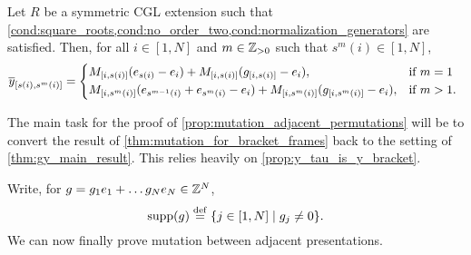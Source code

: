 \begin{theorem}\label{thm:mutation_for_bracket_frames}
	Let $R$ be a symmetric CGL extension such that \cref{cond:square_roots,cond:no_order_two,cond:normalization_generators} are satisfied. Then, for all $i \in [1, N]$ and $m \in \mathbb{Z}_{> 0}$ such that $s^m(i) \in [1, N]$,
	\begin{equation*}
		\oy_{[s(i), s^m(i)]} = \begin{dcases*}
			M_{[i, s(i)]}(e_{s(i)} - e_i) + M_{[i, s(i)]}(g_{[i, s(i)]} - e_i),                         & if $m=1$    \\
			M_{[i, s^m(i)]}(e_{s^{m-1}(i)} + e_{s^m(i)} -e_i) + M_{[i, s^m(i)]}(g_{[i, s^m(i)]} - e_i), & if $m > 1$.
		\end{dcases*}
	\end{equation*}
\end{theorem}

The main task for the proof of \cref{prop:mutation_adjacent_permutations} will be to
convert the result of \cref{thm:mutation_for_bracket_frames} back to the setting of
\cref{thm:gy_main_result}. This relies heavily on \cref{prop:y_tau_is_y_bracket}.

Write, for $g = g_1e_1 + \dots g_N e_N \in \mathbb{Z}^N$,
\begin{equation*}
	\operatorname{supp}(g) \overset{\mathrm{def}}{=} \{j \in [1, N] \mid g_j \neq 0\}.
\end{equation*}
We can now finally prove mutation between adjacent presentations.

